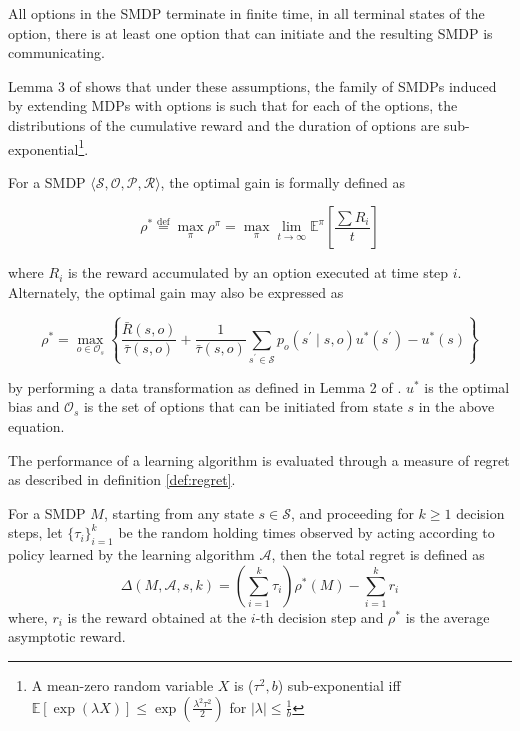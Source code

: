 \begin{assumption}
\label{asm:option}
All options in the SMDP terminate in finite time, in all terminal states of the option, there is at least one option that can initiate and the resulting SMDP is communicating.
\end{assumption}
Lemma 3 of \cite{fruit_exploration--exploitation_2017} shows that under these assumptions, the family of SMDPs induced by extending MDPs with options is such that for each of the options, the distributions of the cumulative reward and the duration of options are sub-exponential\footnote{A mean-zero random variable $X$ is ($\tau^2, b$) sub-exponential iff $\mathbb{E}[\exp(\lambda X)] \le \exp\left( \frac{\lambda^2 \tau^2}{2} \right)$ for $|\lambda| \le \frac{1}{b}$}.

For a SMDP $\langle \mathcal{S}, \mathcal{O}, \mathcal{P}, \mathcal{R} \rangle$, the optimal gain is formally defined as 

\begin{equation}
    \rho^* \overset{\mathrm{def}}{=} \max_\pi \rho^\pi = \max_\pi \lim_{t \to \infty} \mathbb{E}^\pi \left[ \frac{\sum{R_i}}{t} \right]
\end{equation}

where $R_i$ is the reward accumulated by an option executed at time step $i$. Alternately, the optimal gain may also be expressed as

\begin{equation}
    \label{eq:optimal_bias}
    \rho^* = \max_{o \in \mathcal{O}_s} \left\{ \frac{\bar{R}(s, o)}{\bar{\tau}(s, o)} + \frac{1}{\bar{\tau}(s, o)} \sum_{s^\prime \in \mathcal{S}} p_o(s^\prime \mid s, o) u^*(s^\prime) - u^*(s) \right\}
\end{equation}

by performing a data transformation as defined in Lemma 2 of \cite{federgruen_denumerable_1983}. $u^*$ is the optimal bias and $\mathcal{O}_s$ is the set of options that can be initiated from state $s$ in the above equation.

The performance of a learning algorithm is evaluated through a measure of regret as described in definition \ref{def:regret}.

\begin{definition}
\label{def:regret}
For a SMDP $M$, starting from any state $s \in \mathcal{S}$, and proceeding for $k \ge 1$ decision steps, let $\{\tau_i\}_{i=1}^k$ be the random holding times observed by acting according to policy learned by the learning algorithm $\mathcal{A}$, then the total regret is defined as
\begin{equation}
    \Delta(M, \mathcal{A}, s, k) = \left( \sum_{i=1}^k \tau_i \right) \rho^*(M) - \sum_{i=1}^k r_i
\end{equation}
where, $r_i$ is the reward obtained at the $i$-th decision step and $\rho^*$ is the average asymptotic reward.
\end{definition}

